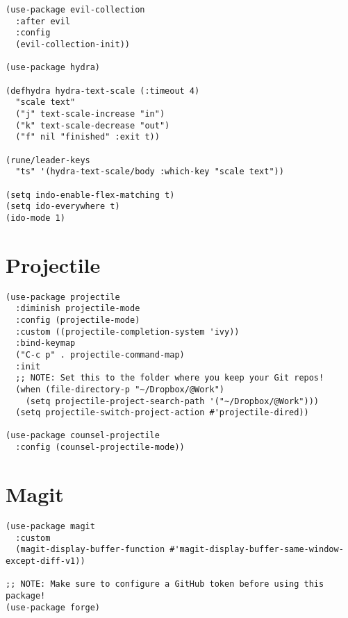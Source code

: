 \documentclass[11pt]{article}
\begin{document}
\begin{verbatim}
(use-package evil-collection
  :after evil
  :config
  (evil-collection-init))

(use-package hydra)

(defhydra hydra-text-scale (:timeout 4)
  "scale text"
  ("j" text-scale-increase "in")
  ("k" text-scale-decrease "out")
  ("f" nil "finished" :exit t))

(rune/leader-keys
  "ts" '(hydra-text-scale/body :which-key "scale text"))

(setq indo-enable-flex-matching t)
(setq ido-everywhere t)
(ido-mode 1)

\end{verbatim}

\section{Projectile}
\label{sec:orgd7d8c4e}
\begin{verbatim}
(use-package projectile
  :diminish projectile-mode
  :config (projectile-mode)
  :custom ((projectile-completion-system 'ivy))
  :bind-keymap
  ("C-c p" . projectile-command-map)
  :init
  ;; NOTE: Set this to the folder where you keep your Git repos!
  (when (file-directory-p "~/Dropbox/@Work")
    (setq projectile-project-search-path '("~/Dropbox/@Work")))
  (setq projectile-switch-project-action #'projectile-dired))

(use-package counsel-projectile
  :config (counsel-projectile-mode))

\end{verbatim}

\section{Magit}
\label{sec:org2367c2c}
\begin{verbatim}
(use-package magit
  :custom
  (magit-display-buffer-function #'magit-display-buffer-same-window-except-diff-v1))

;; NOTE: Make sure to configure a GitHub token before using this package!
(use-package forge)

\end{verbatim}
\end{document}
